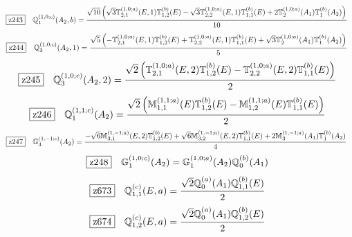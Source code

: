 \documentclass[fleqn,10pt,landscape]{jsarticle}
\begin{document}
\begin{dmath*}
\hspace*{3mm}\fbox{z243}\quad \mathbb{Q}_{1}^{(1,0;c)}(A_{2},b)=\frac{\sqrt{10} \left(\sqrt{3} \mathbb{T}_{2,1}^{(1,0;a)}(E,1) \mathbb{T}_{1,2}^{(b)}(E) - \sqrt{3} \mathbb{T}_{2,2}^{(1,0;a)}(E,1) \mathbb{T}_{1,1}^{(b)}(E) + 2 \mathbb{T}_{2}^{(1,0;a)}(A_{1}) \mathbb{T}_{1}^{(b)}(A_{2})\right)}{10}
\end{dmath*}
\begin{dmath*}
\hspace*{3mm}\fbox{z244}\quad \mathbb{Q}_{3}^{(1,0;c)}(A_{2},1)=\frac{\sqrt{5} \left(- \mathbb{T}_{2,1}^{(1,0;a)}(E,1) \mathbb{T}_{1,2}^{(b)}(E) + \mathbb{T}_{2,2}^{(1,0;a)}(E,1) \mathbb{T}_{1,1}^{(b)}(E) + \sqrt{3} \mathbb{T}_{2}^{(1,0;a)}(A_{1}) \mathbb{T}_{1}^{(b)}(A_{2})\right)}{5}
\end{dmath*}
\begin{dmath*}
\hspace*{3mm}\fbox{z245}\quad \mathbb{Q}_{3}^{(1,0;c)}(A_{2},2)=\frac{\sqrt{2} \left(\mathbb{T}_{2,1}^{(1,0;a)}(E,2) \mathbb{T}_{1,2}^{(b)}(E) - \mathbb{T}_{2,2}^{(1,0;a)}(E,2) \mathbb{T}_{1,1}^{(b)}(E)\right)}{2}
\end{dmath*}
\begin{dmath*}
\hspace*{3mm}\fbox{z246}\quad \mathbb{Q}_{1}^{(1,1;c)}(A_{2})=\frac{\sqrt{2} \left(\mathbb{M}_{1,1}^{(1,1;a)}(E) \mathbb{T}_{1,2}^{(b)}(E) - \mathbb{M}_{1,2}^{(1,1;a)}(E) \mathbb{T}_{1,1}^{(b)}(E)\right)}{2}
\end{dmath*}
\begin{dmath*}
\hspace*{3mm}\fbox{z247}\quad \mathbb{G}_{4}^{(1,-1;c)}(A_{2})=\frac{- \sqrt{6} \mathbb{M}_{3,1}^{(1,-1;a)}(E,2) \mathbb{T}_{1,2}^{(b)}(E) + \sqrt{6} \mathbb{M}_{3,2}^{(1,-1;a)}(E,2) \mathbb{T}_{1,1}^{(b)}(E) + 2 \mathbb{M}_{3}^{(1,-1;a)}(A_{1}) \mathbb{T}_{1}^{(b)}(A_{2})}{4}
\end{dmath*}
\begin{dmath*}
\hspace*{3mm}\fbox{z248}\quad \mathbb{G}_{1}^{(1,0;c)}(A_{2})=\mathbb{G}_{1}^{(1,0;a)}(A_{2}) \mathbb{Q}_{0}^{(b)}(A_{1})
\end{dmath*}
\begin{dmath*}
\hspace*{3mm}\fbox{z673}\quad \mathbb{Q}_{1,1}^{(c)}(E,a)=\frac{\sqrt{2} \mathbb{Q}_{0}^{(a)}(A_{1}) \mathbb{Q}_{1,1}^{(b)}(E)}{2}
\end{dmath*}
\begin{dmath*}
\hspace*{3mm}\fbox{z674}\quad \mathbb{Q}_{1,2}^{(c)}(E,a)=\frac{\sqrt{2} \mathbb{Q}_{0}^{(a)}(A_{1}) \mathbb{Q}_{1,2}^{(b)}(E)}{2}
\end{dmath*}
\end{document}
